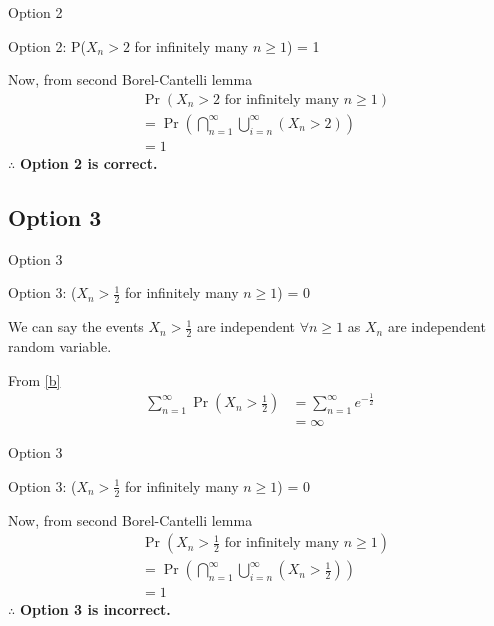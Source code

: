\documentclass{beamer}
\providecommand{\pr}[1]{\ensuremath{\Pr\left(#1\right)}}
\providecommand{\pr}[1]{\ensuremath{\Pr\left(#1\right)}}
\providecommand{\brak}[1]{\ensuremath{\left(#1\right)}}
\theoremstyle{remark}
\numberwithin{equation}{subsection}
\begin{document}
\begin{frame}{Option 2}
\begin{block}{Option 2: P($X_n > 2$ for infinitely many $n \geq 1$) = 1}

    Now, from second Borel-Cantelli lemma
    \begin{align}
        &\pr{X_n>2 \text{ for infinitely many }n\geq1}\nonumber\\
        &=\pr{\bigcap_{n=1}^{\infty}\bigcup_{i=n}^{\infty}\brak{ X_n>2}}\nonumber\\
        &=1\nonumber
    \end{align}
    $\therefore$ \textbf{Option 2 is correct.}

\end{block}
\end{frame}


\subsection{Option 3}
\begin{frame}{Option 3}
\begin{block}{Option 3: ($X_n > \frac{1}{2}$ for infinitely many $n \geq 1$) = 0}

We can say the events $X_n>\frac{1}{2}$ are independent $\forall n\geq 1$ as $X_n$ are independent random variable.
    
    From \eqref{b}
    \begin{align}
        \sum_{n=1}^{\infty}\pr{X_n > \frac{1}{2}} &= \sum_{n=1}^{\infty}e^{-\frac{1}{2}}\nonumber\\
                                            &= \infty\nonumber
    \end{align}
    
\end{block}
\end{frame}

\begin{frame}{Option 3}
\begin{block}{Option 3: ($X_n > \frac{1}{2}$ for infinitely many $n \geq 1$) = 0}

    Now, from second Borel-Cantelli lemma
    \begin{align}
        &\pr{X_n>\frac{1}{2} \text{ for infinitely many }n\geq1}\nonumber\\
        &=\pr{\bigcap_{n=1}^{\infty}\bigcup_{i=n}^{\infty}\brak{ X_n>\frac{1}{2}}}\nonumber\\
        &=1\nonumber
    \end{align}
    $\therefore$ \textbf{Option 3 is incorrect.}

\end{block}
\end{frame}
\end{document}
